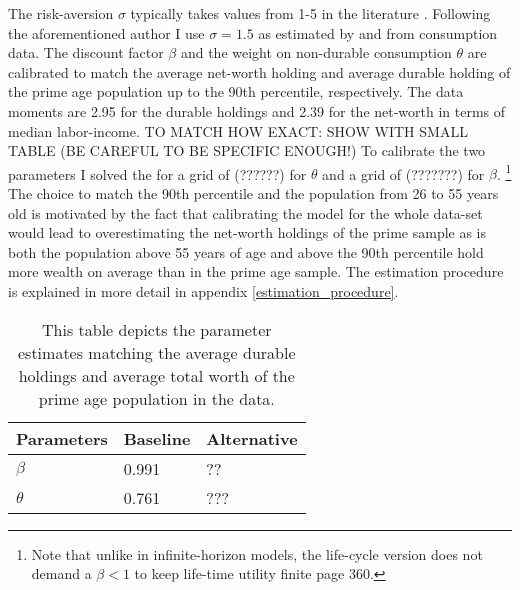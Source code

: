 \documentclass[a4paper,12pt,legno]{article}
\begin{document}
The risk-aversion $\sigma$ typically takes values from 1-5 in the literature \citep{yang2009}. Following the aforementioned author I use $\sigma = 1.5$ as estimated by \cite{attanasio1999} and \cite{Gourinchas&Parker2002} from consumption data. The discount factor $\beta$ and the weight on non-durable consumption $\theta$ are calibrated to match the average net-worth holding and average durable holding of the prime age population up to the 90th percentile, respectively. The data moments are 2.95 for the durable holdings and 2.39 for the net-worth in terms of median labor-income. TO MATCH HOW EXACT: SHOW WITH SMALL TABLE (BE CAREFUL TO BE SPECIFIC ENOUGH!) To calibrate the two parameters I solved the for a grid of (??????) for $\theta$ and a grid of (???????) for $\beta$. \footnote{Note that unlike in infinite-horizon models, the life-cycle version does not demand a $\beta < 1$ to keep life-time utility finite \cite{heer2004dge} page 360.} The choice to match the 90th percentile and the population from 26 to 55 years old is motivated by the fact that calibrating the model for the whole data-set would lead to overestimating the net-worth holdings of the prime sample \textendash as is both the population above 55 years of age and above the 90th percentile hold more wealth on average than in the prime age sample. The estimation procedure is explained in more detail in appendix \ref{estimation_procedure}. 

\begin{table}[!htbp]
\centering
\caption{This table depicts the parameter estimates matching the average durable holdings and average total worth of the prime age population in the data.}
\label{estimates}
\begin{tabular}{llll}
\hline
\multicolumn{2}{l}{Parameters} & Baseline & Alternative \\ \hline
\multicolumn{2}{l}{$\beta$}             & 0.991    & ??          \\
\multicolumn{2}{l}{$\theta$}            & 0.761    & ???        
\end{tabular}
\end{table}
\end{document}
